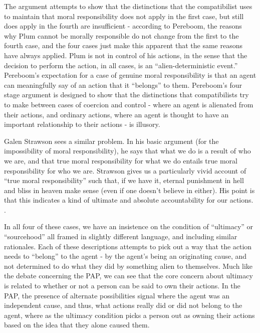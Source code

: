 \documentclass[phd,12pt,oneside,paper=letterpaper]{ubcthesis}
\begin{document}
The argument attempts to show that the distinctions that the compatibilist uses to maintain that moral responsibility does not apply in the first case, but still does apply in the fourth are insufficient - according to Pereboom, the reasons why Plum cannot be morally responsible do not change from the first to the fourth case, and the four cases just make this apparent that the same reasons have always applied. Plum is not in control of his actions, in the sense that the decision to perform the action, in all cases, is an ``alien-deterministic event.'' Pereboom's expectation for a case of genuine moral responsibility is that an agent can meaningfully say of an action that it ``belongs'' to them. Pereboom's four stage argument is designed to show that the distinctions that compatibilists try to make between cases of coercion and control - where an agent is alienated from their actions, and ordinary actions, where an agent is thought to have an important relationship to their actions - is illusory. 

Galen Strawson sees a similar problem. In his basic argument (for the impossibility of moral responsibility), he says that what we do is a result of who we are, and that true moral responsibility for what we do entails true moral responsibility for who we are. Strawson gives us a particularly vivid account of ``true moral responsibility'' such that, if we have it, eternal punishment in hell and bliss in heaven make sense (even if one doesn't believe in either). His point is that this indicates a kind of ultimate and absolute accountability for our actions. \citep{strawsong2010}.

In all four of these cases, we have an insistence on the condition of ``ultimacy'' or ``sourcehood'' all framed in slightly different language, and including similar rationales. Each of these descriptions attempts to pick out a way that the action needs to ``belong'' to the agent - by the agent's being an originating cause, and not determined to do what they did by something alien to themselves. Much like the debate concerning the PAP, we can see that the core concern about ultimacy is related to whether or not a person can be said to own their actions. In the PAP, the presence of alternate possibilities signal where the agent was an independent cause, and thus, what actions really did or did not belong to the agent, where as the ultimacy condition picks a person out as owning their actions based on the idea that they alone caused them. 
\end{document}
